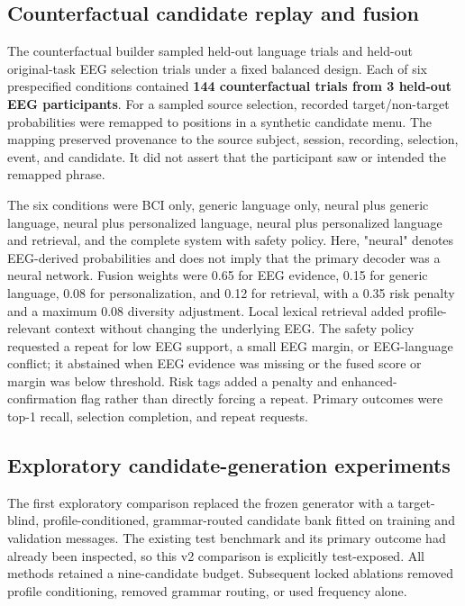 \documentclass[11pt]{article}
\begin{document}
\subsection{Counterfactual candidate replay and fusion}

The counterfactual builder sampled held-out language trials and held-out original-task EEG selection trials under a fixed balanced design. Each of six prespecified conditions contained \textbf{144 counterfactual trials from 3 held-out EEG participants}. For a sampled source selection, recorded target/non-target probabilities were remapped to positions in a synthetic candidate menu. The mapping preserved provenance to the source subject, session, recording, selection, event, and candidate. It did not assert that the participant saw or intended the remapped phrase.


The six conditions were BCI only, generic language only, neural plus generic language, neural plus personalized language, neural plus personalized language and retrieval, and the complete system with safety policy. Here, "neural" denotes EEG-derived probabilities and does not imply that the primary decoder was a neural network. Fusion weights were 0.65 for EEG evidence, 0.15 for generic language, 0.08 for personalization, and 0.12 for retrieval, with a 0.35 risk penalty and a maximum 0.08 diversity adjustment. Local lexical retrieval added profile-relevant context without changing the underlying EEG. The safety policy requested a repeat for low EEG support, a small EEG margin, or EEG-language conflict; it abstained when EEG evidence was missing or the fused score or margin was below threshold. Risk tags added a penalty and enhanced-confirmation flag rather than directly forcing a repeat. Primary outcomes were top-1 recall, selection completion, and repeat requests.


\subsection{Exploratory candidate-generation experiments}

The first exploratory comparison replaced the frozen generator with a target-blind, profile-conditioned, grammar-routed candidate bank fitted on training and validation messages. The existing test benchmark and its primary outcome had already been inspected, so this v2 comparison is explicitly test-exposed. All methods retained a nine-candidate budget. Subsequent locked ablations removed profile conditioning, removed grammar routing, or used frequency alone.
\end{document}
